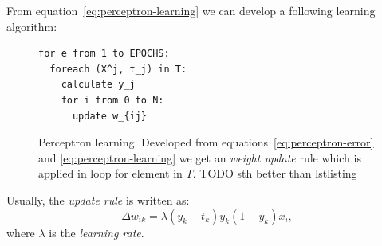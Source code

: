 From equation~\ref{eq:perceptron-learning} we can develop a following learning algorithm: 
\begin{figure}[h]
  \centering
\begin{lstlisting}
for e from 1 to EPOCHS: 
  foreach (X^j, t_j) in T: 
    calculate y_j
    for i from 0 to N: 
      update w_{ij}
\end{lstlisting}
  \caption{Perceptron learning. Developed from equations~\ref{eq:perceptron-error} and \ref{eq:perceptron-learning} we get an \emph{weight update} rule which is applied in loop for element in $T$. TODO sth better than lstlisting} 
  \label{fig:perceptron-learning}
\end{figure}

Usually, the \emph{update rule} is written as: 
\begin{equation} 
\Delta w_{ik} = \lambda (y_k - t_k)y_k(1 - y_k)x_i,
\end{equation} 
where $\lambda$ is the \emph{learning rate}. 

